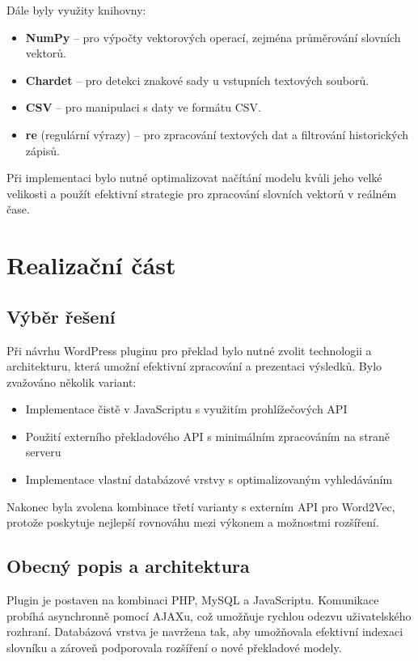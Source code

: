\documentclass[czech, ba, kiv, he]{fasthesis}
\begin{document}
Dále byly využity knihovny:  
\begin{itemize}  
    \item \textbf{NumPy} – pro výpočty vektorových operací, zejména průměrování slovních vektorů.  
    \item \textbf{Chardet} – pro detekci znakové sady u vstupních textových souborů.  
    \item \textbf{CSV} – pro manipulaci s daty ve formátu CSV.  
    \item \textbf{re} (regulární výrazy) – pro zpracování textových dat a filtrování historických zápisů.  
\end{itemize}  

Při implementaci bylo nutné optimalizovat načítání modelu kvůli jeho velké velikosti a použít efektivní strategie pro zpracování slovních vektorů v reálném čase.

\chapter{Realizační část}

\section{Výběr řešení}
Při návrhu WordPress pluginu pro překlad bylo nutné zvolit technologii a architekturu, která umožní efektivní zpracování a prezentaci výsledků. Bylo zvažováno několik variant:

\begin{itemize}
    \item Implementace čistě v JavaScriptu s využitím prohlížečových API
    \item Použití externího překladového API s minimálním zpracováním na straně serveru
    \item Implementace vlastní databázové vrstvy s optimalizovaným vyhledáváním
\end{itemize}

Nakonec byla zvolena kombinace třetí varianty s externím API pro Word2Vec, protože poskytuje nejlepší rovnováhu mezi výkonem a možnostmi rozšíření.

\section{Obecný popis a architektura}
Plugin je postaven na kombinaci PHP, MySQL a JavaScriptu. Komunikace probíhá asynchronně pomocí AJAXu, což umožňuje rychlou odezvu uživatelského rozhraní. Databázová vrstva je navržena tak, aby umožňovala efektivní indexaci slovníku a zároveň podporovala rozšíření o nové překladové modely. 
\end{document}
